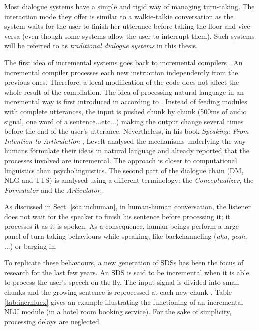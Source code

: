     Most dialogue systems have a simple and rigid way of managing turn-taking. The interaction mode they offer is similar to a walkie-talkie conversation as the system waits for the user to finish her utterance before taking the floor and vice-versa (even though some systems allow the user to interrupt them). Such systems will be referred to as \textit{traditional dialogue systems} in this thesis.
    
    The first idea of incremental systems goes back to incremental compilers \cite{Lock1965}. An incremental compiler processes each new instruction independently from the previous ones. Therefore, a local modification of the code does not affect the whole result of the compilation. The idea of processing natural language in an incremental way is first introduced in \cite{Wiren1992} according to \cite{Kilger1995}. Instead of feeding modules with complete utterances, the input is pushed chunk by chunk (500ms of audio signal, one word of a sentence...etc...) making the output change several times before the end of the user's utterance. Nevertheless, in his book \textit{Speaking: From Intention to Articulation} \cite{Levelt1989}, Levelt analysed the mechanisms underlying the way humans formulate their ideas in natural language and already reported that the processes involved are incremental. The approach is closer to computational linguistics than psycholinguistics. The second part of the dialogue chain (DM, NLG and TTS) is analysed using a different terminology: the \textit{Conceptualizer}, the \textit{Formulator} and the \textit{Articulator}.

    As discussed in Sect. \ref{soa:inchuman}, in human-human conversation, the listener does not wait for the speaker to finish his sentence before processing it; it processes it as it is spoken. As a consequence, human beings perform a large panel of turn-taking behaviours while speaking, like backchanneling (\textit{aha}, \textit{yeah}, ...) or barging-in.

    To replicate these behaviours, a new generation of SDSs has been the focus of research for the last few years. An SDS is said to be incremental when it is able to process the user's speech on the fly. The input signal is divided into small chunks and the growing sentence is reprocessed at each new chunk \cite{Schlangen2011}. Table \ref{tab:incrnluex} gives an example illustrating the functioning of an incremental NLU module (in a hotel room booking service). For the sake of simplicity, processing delays are neglected.

